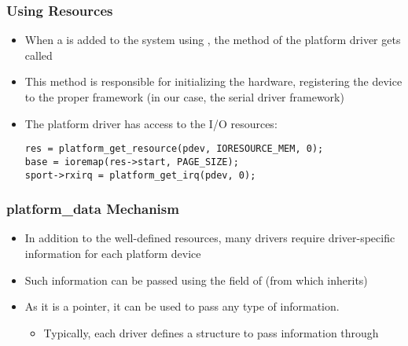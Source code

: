 \begin{frame}[fragile]
  \frametitle{Using Resources}
  \begin{itemize}
  \item When a  is added to the system using
    , the  method of the
    platform driver gets called
  \item This method is responsible for initializing the hardware,
    registering the device to the proper framework (in our case, the
    serial driver framework)
  \item The platform driver has access to the I/O resources:
    \begin{block}{}
  \begin{verbatim}
res = platform_get_resource(pdev, IORESOURCE_MEM, 0);
base = ioremap(res->start, PAGE_SIZE);
sport->rxirq = platform_get_irq(pdev, 0);
  \end{verbatim}
  \end{block}
  \end{itemize}
\end{frame}

\begin{frame}
  \frametitle{platform\_data Mechanism}
  \begin{itemize}
  \item In addition to the well-defined resources, many drivers
    require driver-specific information for each platform device
  \item Such information can be passed using the 
    field of  (from which
     inherits)
  \item As it is a  pointer, it can be used to pass any
    type of information.
    \begin{itemize}
    \item Typically, each driver defines a structure to pass
      information through 
    \end{itemize}
  \end{itemize}
\end{frame}

